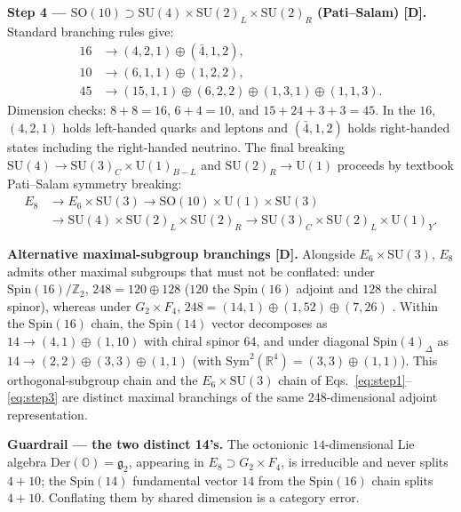 \documentclass[11pt]{article}
\begin{document}
\noindent\textbf{Step 4 --- $\mathrm{SO}(10) \supset \mathrm{SU}(4) \times \mathrm{SU}(2)_L \times \mathrm{SU}(2)_R$ (Pati--Salam) [D].} Standard branching rules \cite{slansky} give:
\begin{align}
16 &\to (4,2,1) \oplus (\bar{4},1,2), \label{eq:ps16} \\
10 &\to (6,1,1) \oplus (1,2,2), \label{eq:ps10} \\
45 &\to (15,1,1) \oplus (6,2,2) \oplus (1,3,1) \oplus (1,1,3). \label{eq:ps45}
\end{align}
Dimension checks: $8 + 8 = 16$, $6 + 4 = 10$, and $15 + 24 + 3 + 3 = 45$. In the $16$, $(4,2,1)$ holds left-handed quarks and leptons and $(\bar{4},1,2)$ holds right-handed states including the right-handed neutrino. The final breaking $\mathrm{SU}(4) \to \mathrm{SU}(3)_C \times \mathrm{U}(1)_{B-L}$ and $\mathrm{SU}(2)_R \to \mathrm{U}(1)$ proceeds by textbook Pati--Salam symmetry breaking:
\begin{equation}
\label{eq:chain}
\begin{aligned}
E_8 &\to E_6 \times \mathrm{SU}(3) \to \mathrm{SO}(10) \times \mathrm{U}(1) \times \mathrm{SU}(3) \\
&\to \mathrm{SU}(4) \times \mathrm{SU}(2)_L \times \mathrm{SU}(2)_R \to \mathrm{SU}(3)_C \times \mathrm{SU}(2)_L \times \mathrm{U}(1)_Y.
\end{aligned}
\end{equation}

\noindent\textbf{Alternative maximal-subgroup branchings [D].} Alongside $E_6 \times \mathrm{SU}(3)$, $E_8$ admits other maximal subgroups that must not be conflated: under $\mathrm{Spin}(16)/\mathbb{Z}_2$, $248 = 120 \oplus 128$ ($120$ the $\mathrm{Spin}(16)$ adjoint and $128$ the chiral spinor), whereas under $G_2 \times F_4$, $248 = (14,1) \oplus (1,52) \oplus (7,26)$ \cite{slansky}. Within the $\mathrm{Spin}(16)$ chain, the $\mathrm{Spin}(14)$ vector decomposes as $14 \to (4,1) \oplus (1,10)$ with chiral spinor $64$, and under diagonal $\mathrm{Spin}(4)_\Delta$ as $14 \to (2,2) \oplus (3,3) \oplus (1,1)$ (with $\mathrm{Sym}^2(\mathbb{R}^4) = (3,3) \oplus (1,1)$). This orthogonal-subgroup chain and the $E_6 \times \mathrm{SU}(3)$ chain of Eqs.~\eqref{eq:step1}--\eqref{eq:step3} are distinct maximal branchings of the same 248-dimensional adjoint representation.

\noindent\textbf{Guardrail --- the two distinct 14's.} The octonionic $14$-dimensional Lie algebra $\mathrm{Der}(\mathbb{O}) = \mathfrak{g}_2$, appearing in $E_8 \supset G_2 \times F_4$, is irreducible and never splits $4 + 10$; the $\mathrm{Spin}(14)$ fundamental vector $14$ from the $\mathrm{Spin}(16)$ chain splits $4 + 10$. Conflating them by shared dimension is a category error.
\end{document}
